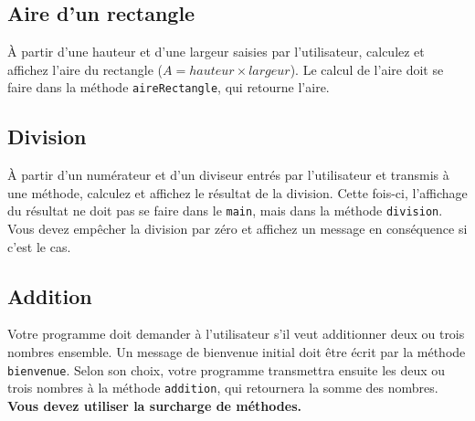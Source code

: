 \documentclass[12pt]{article}
\begin{document}
\subsection{Aire d'un rectangle}

À partir d’une hauteur et d’une largeur saisies par l’utilisateur, calculez et affichez l’aire du rectangle ($A = hauteur \times largeur $). Le calcul de l’aire doit se faire dans la méthode \verb|aireRectangle|, qui retourne l’aire.

%
%
%

\subsection{Division}

À partir d’un numérateur et d’un diviseur entrés par l’utilisateur et transmis à une méthode, calculez et affichez le résultat de la division. Cette fois-ci, l’affichage du résultat ne doit pas se faire dans le \verb|main|, mais dans la méthode \verb|division|. Vous devez empêcher la division par zéro et affichez un message en conséquence si c'est le cas.

%
%
%

\subsection{Addition}

Votre programme doit demander à l’utilisateur s’il veut additionner deux ou trois nombres ensemble. Un message de bienvenue initial doit être écrit par la méthode \verb|bienvenue|. Selon son choix, votre programme transmettra ensuite les deux ou trois nombres à la méthode \verb|addition|, qui retournera la somme des nombres. \textbf{Vous devez utiliser la surcharge de méthodes.}
\end{document}
